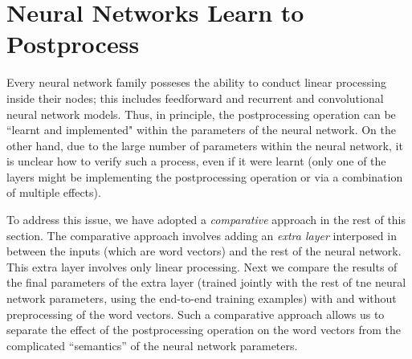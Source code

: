 \documentclass{article} \usepackage{acl2017,times}
\begin{document}
{
\section{Neural Networks Learn to Postprocess}
\label{app:neuralnet}


Every neural network family  posseses the ability to  conduct linear processing inside their nodes; this includes feedforward and recurrent and  convolutional neural network models. Thus, in principle, the  postprocessing operation  can be  ``learnt and implemented"  
within  the parameters of the neural network. On the other hand, due to the large number of parameters within the neural network, it is unclear how to verify such a process, even if it were learnt (only one of the layers might be implementing the postprocessing operation or via a combination of multiple effects). 


To address this issue, we have adopted a {\em comparative} approach  in the rest of this section. The comparative approach involves adding an {\em extra layer} interposed in between the inputs (which are word vectors) and the  rest of the neural network. This extra layer involves only linear processing. Next we compare the results of the  final  
parameters  of the extra layer  (trained jointly  with the rest of tne neural network parameters, using the end-to-end training examples) with and without  preprocessing of the  word vectors.  Such a comparative approach  allows us to separate the effect of the  postprocessing operation on the  word vectors  from the complicated ``semantics'' of the neural network parameters. 
 


}
\end{document}
